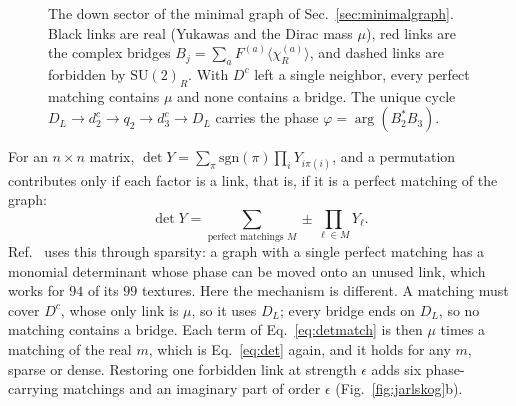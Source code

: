 \documentclass[submission, Phys]{SciPost}
\newcommand{\SU}{\mathrm{SU}}
\newcommand{\vev}[1]{\langle #1\rangle}
\begin{document}
\begin{figure}[t]
\centering
{}
\caption{The down sector of the minimal graph of
Sec.~\ref{sec:minimalgraph}. Black links are real (Yukawas and the
Dirac mass $\mu$), red links are the complex bridges
$B_j=\sum_aF^{(a)}\vev{\chi^{(a)}_R}$, and dashed links are forbidden
by $\SU(2)_R$. With $D^c$ left a single neighbor, every perfect matching
contains $\mu$ and none contains a bridge. The unique cycle
$D_L\to d^c_2\to q_2\to d^c_3\to D_L$ carries the phase
$\varphi=\arg(B_2^*B_3)$.}
\label{fig:linkgraph}
\end{figure}

For an $n\times n$ matrix, $\det Y=\sum_{\pi}\mathrm{sgn}(\pi)\prod_iY_{i\pi(i)}$,
and a permutation contributes only if each factor is a link, that is,
if it is a perfect matching of the graph:
\begin{equation}
  \det Y=\sum_{\text{perfect matchings }M}\pm\prod_{\ell\in M}Y_\ell .
  \label{eq:detmatch}
\end{equation}
Ref.~\cite{Arkani-Hamed:2026uos} uses this through sparsity: a graph
with a single perfect matching has a monomial determinant whose phase
can be moved onto an unused link, which works for $94$ of its $99$
textures. Here the mechanism is different. A matching must cover
$D^c$, whose only link is $\mu$, so it uses $D_L$; every bridge ends on
$D_L$, so no matching contains a bridge. Each term of
Eq.~\eqref{eq:detmatch} is then $\mu$ times a matching of the real $m$,
which is Eq.~\eqref{eq:det} again, and it holds for any $m$, sparse or
dense. Restoring one forbidden link at strength $\epsilon$ adds six
phase-carrying matchings and an imaginary part of order $\epsilon$
(Fig.~\ref{fig:jarlskog}b).
\end{document}
